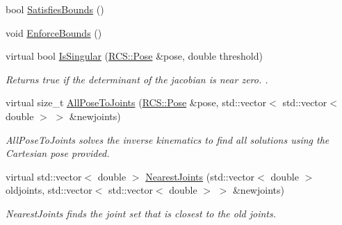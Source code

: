 \begin{DoxyCompactItemize}
bool \hyperlink{classRosKinematics_ae51c062c810983b29d418399d38da42f}{Satisfies\-Bounds} ()
\item 
void \hyperlink{classRosKinematics_a19e0993e7e188491918785f4ca6ce115}{Enforce\-Bounds} ()
\item 
virtual bool \hyperlink{classRosKinematics_aba5780a92ef59b3b27eb204b68989588}{Is\-Singular} (\hyperlink{namespaceRCS_aa07e45d8a50e30064283d2b38087f999}{R\-C\-S\-::\-Pose} \&pose, double threshold)
\begin{DoxyCompactList}\small\item\em Returns true if the determinant of the jacobian is near zero. . \end{DoxyCompactList}\item 
virtual size\-\_\-t \hyperlink{classRosKinematics_ae3d78b75e8cbd38a12d451e0e0e95548}{All\-Pose\-To\-Joints} (\hyperlink{namespaceRCS_aa07e45d8a50e30064283d2b38087f999}{R\-C\-S\-::\-Pose} \&pose, std\-::vector$<$ std\-::vector$<$ double $>$ $>$ \&newjoints)
\begin{DoxyCompactList}\small\item\em All\-Pose\-To\-Joints solves the inverse kinematics to find all solutions using the Cartesian pose provided. \end{DoxyCompactList}\item 
virtual std\-::vector$<$ double $>$ \hyperlink{classRosKinematics_ab50d3e7666cf3b2bdb1ae3d5e0a7db8e}{Nearest\-Joints} (std\-::vector$<$ double $>$ oldjoints, std\-::vector$<$ std\-::vector$<$ double $>$ $>$ \&newjoints)
\begin{DoxyCompactList}\small\item\em Nearest\-Joints finds the joint set that is closest to the old joints. \end{DoxyCompactList}\end{DoxyCompactItemize}
